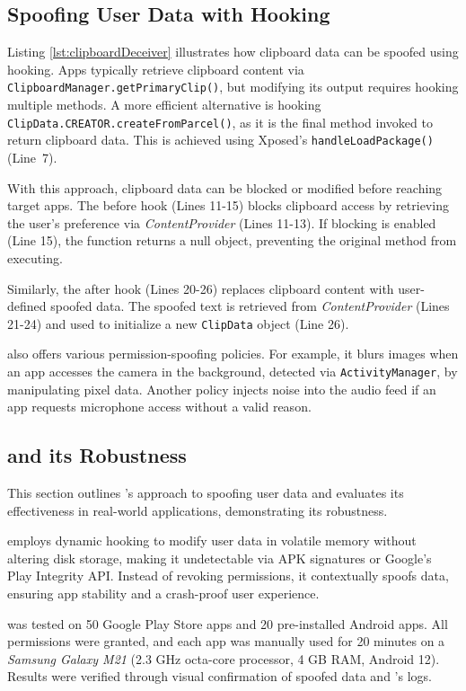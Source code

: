 \subsection{Spoofing User Data with Hooking}

Listing \ref{lst:clipboardDeceiver} illustrates how clipboard data can be spoofed using hooking. Apps typically retrieve clipboard content via \texttt{ClipboardManager.getPrimaryClip()}, but modifying its output requires hooking multiple methods. A more efficient alternative is hooking \texttt{ClipData.CREATOR.createFromParcel()}, as it is the final method invoked to return clipboard data. This is achieved using Xposed's \texttt{handleLoadPackage()} (Line~7).

With this approach, clipboard data can be blocked or modified before reaching target apps. The before hook (Lines 11-15) blocks clipboard access by retrieving the user's preference via \textit{ContentProvider} (Lines 11-13). If blocking is enabled (Line 15), the function returns a null object, preventing the original method from executing.

Similarly, the after hook (Lines 20-26) replaces clipboard content with user-defined spoofed data. The spoofed text is retrieved from \textit{ContentProvider} (Lines 21-24) and used to initialize a new \texttt{ClipData} object (Line 26).

\framework{} also offers various permission-spoofing policies. For example, it blurs images when an app accesses the camera in the background, detected via \texttt{ActivityManager}, by manipulating pixel data. Another policy injects noise into the audio feed if an app requests microphone access without a valid reason.

\subsection{\framework{} and its Robustness}
This section outlines \framework{}'s approach to spoofing user data and evaluates its effectiveness in real-world applications, demonstrating its robustness.

 \framework{} employs dynamic hooking to modify user data in volatile memory without altering disk storage, making it undetectable via APK signatures or Google's Play Integrity API. Instead of revoking permissions, it contextually spoofs data, ensuring app stability and a crash-proof user experience.

 \framework{} was tested on 50 Google Play Store apps and 20 pre-installed Android apps. All permissions were granted, and each app was manually used for 20 minutes on a \textit{Samsung Galaxy M21} (2.3 GHz octa-core processor, 4 GB RAM, Android 12). Results were verified through visual confirmation of spoofed data and \framework{}'s logs.

